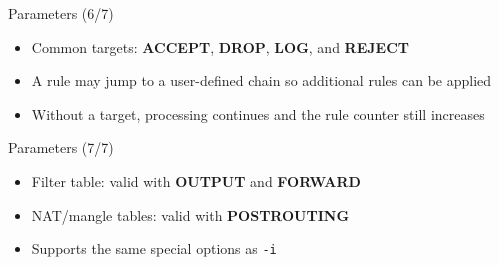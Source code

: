\begin{frame}[t]{Parameters (6/7)}
\begin{itemize}
  \item Common targets: \textcolor{WarningColor}{\bfseries ACCEPT}, \textcolor{WarningColor}{\bfseries DROP}, \textcolor{WarningColor}{\bfseries LOG}, and \textcolor{WarningColor}{\bfseries REJECT}
  \item A rule may jump to a user-defined chain so additional rules can be applied
  \item Without a target, processing continues and the rule counter still increases
\end{itemize}
\end{frame}

\begin{frame}[t]{Parameters (7/7)}
\begin{itemize}
  \item Filter table: valid with \textcolor{WarningColor}{\bfseries OUTPUT} and \textcolor{WarningColor}{\bfseries FORWARD}
  \item NAT/mangle tables: valid with \textcolor{WarningColor}{\bfseries POSTROUTING}
  \item Supports the same special options as \texttt{-i}
\end{itemize}
\end{frame}
